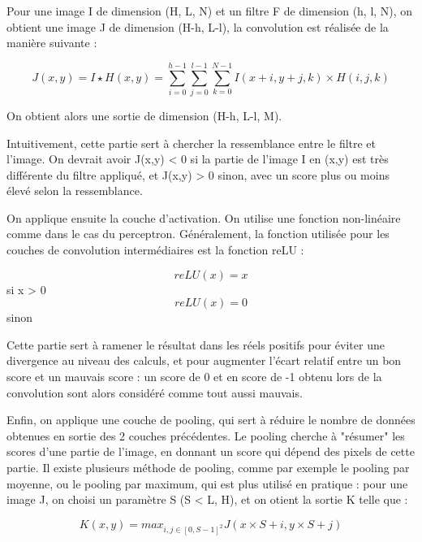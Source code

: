 Pour une image I de dimension (H, L, N) et un filtre F de dimension (h, l, N), on obtient une image J de dimension (H-h, L-l), la convolution est réalisée de la manière suivante :

\begin{equation}
    J(x, y) = I \star H (x, y) = \sum_{i=0}^{h - 1} \sum_{j=0}^{l- 1} \sum_{k=0}^{N - 1} I(x+i, y+j, k) \times H(i, j, k)
\end{equation}

On obtient alors une sortie de dimension (H-h, L-l, M).

Intuitivement, cette partie sert à chercher la ressemblance entre le filtre et l'image.
On devrait avoir J(x,y) < 0 si la partie de l'image I en (x,y) est très différente du filtre appliqué, et J(x,y) > 0 sinon, avec un score plus ou moins élevé selon la ressemblance.


On applique ensuite la couche d'activation. On utilise une fonction non-linéaire comme dans le cas du perceptron. 
Généralement, la fonction utilisée pour les couches de convolution intermédiaires est la fonction reLU :

\begin{equation}
    reLU (x) = x
\end{equation} si x > 0
\begin{equation}
    reLU (x) = 0 
\end{equation} sinon


\newpage 

Cette partie sert à ramener le résultat dans les réels positifs pour éviter une divergence au niveau des calculs, et pour augmenter l'écart relatif entre un bon score et un mauvais score : un score de 0 et en score de -1 obtenu lors de la convolution sont alors considéré comme tout aussi mauvais.

Enfin, on applique une couche de pooling, qui sert à réduire le nombre de données obtenues en sortie des 2 couches précédentes.
Le pooling cherche à "résumer" les scores d'une partie de l'image, en donnant un score qui dépend des pixels de cette partie.
Il existe plusieurs méthode de pooling, comme par exemple le pooling par moyenne, ou le pooling par maximum, qui est plus utilisé en pratique :
pour une image J, on choisi un paramètre S (S < L, H), et on otient la sortie K telle que :

\begin{equation}
    K(x, y) = max_{i,j \in [0, S-1] ^2 } { J(x \times S + i , y \times S + j ) }
\end{equation}


